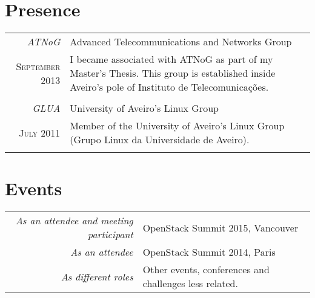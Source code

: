 \documentclass[letter,10pt]{article} %
\begin{document}
%

\section{Presence}
\begin{tabular}{r|p{11cm}}
    \emph{ATNoG} & Advanced Telecommunications and Networks Group \\
    \textsc{September 2013} & \footnotesize{I became associated with ATNoG as part of my Master's Thesis. This group is established inside Aveiro's pole of Instituto de Telecomunicações.}\\
    \multicolumn{2}{c}{} \\
    \emph{GLUA} & University of Aveiro's Linux Group \\
    \textsc{July 2011} & \footnotesize{Member of the University of Aveiro's Linux Group (Grupo Linux da Universidade de Aveiro).}\\
    \multicolumn{2}{c}{}\\
\end{tabular}


\section{Events}
\begin{tabular}{r|p{11cm}}
    \emph{As an attendee and meeting participant} & OpenStack Summit 2015, Vancouver \\
    \emph{As an attendee} & OpenStack Summit 2014, Paris \\
    \emph{As different roles} & Other events, conferences and challenges less related. \\
\end{tabular} \\
\end{document}
